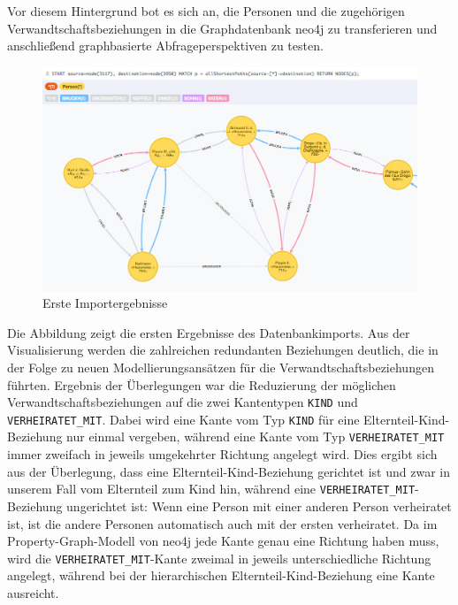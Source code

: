\documentclass[ngerman,]{scrreprt}
\begin{document}
Vor diesem Hintergrund bot es sich an, die Personen und die zugehörigen Verwandtschaftsbeziehungen in die Graphdatenbank neo4j zu transferieren und anschließend graphbasierte Abfrageperspektiven zu testen.

\begin{figure}
\centering
\includegraphics{Bilder/NeG/020-Verwandschaften.jpg}
\caption{Erste Importergebnisse}
\end{figure}

Die Abbildung zeigt die ersten Ergebnisse des Datenbankimports. Aus der Visualisierung werden die zahlreichen redundanten Beziehungen deutlich, die in der Folge zu neuen Modellierungsansätzen für die Verwandtschaftsbeziehungen führten. Ergebnis der Überlegungen war die Reduzierung der möglichen Verwandtschaftsbeziehungen auf die zwei Kantentypen \texttt{KIND} und \texttt{VERHEIRATET\_MIT}. Dabei wird eine Kante vom Typ \texttt{KIND} für eine Elternteil-Kind-Beziehung nur einmal vergeben, während eine Kante vom Typ \texttt{VERHEIRATET\_MIT} immer zweifach in jeweils umgekehrter Richtung angelegt wird. Dies ergibt sich aus der Überlegung, dass eine Elternteil-Kind-Beziehung gerichtet ist und zwar in unserem Fall vom Elternteil zum Kind hin, während eine \texttt{VERHEIRATET\_MIT}-Beziehung ungerichtet ist: Wenn eine Person mit einer anderen Person verheiratet ist, ist die andere Personen automatisch auch mit der ersten verheiratet. Da im Property-Graph-Modell von neo4j jede Kante genau eine Richtung haben muss, wird die \texttt{VERHEIRATET\_MIT}-Kante zweimal in jeweils unterschiedliche Richtung angelegt, während bei der hierarchischen Elternteil-Kind-Beziehung eine Kante ausreicht.
\end{document}
